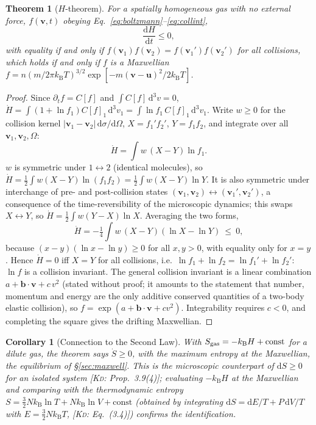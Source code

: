 \documentclass[11pt,a4paper]{report}
\theoremstyle{definition}
\theoremstyle{plain}
\newtheorem{theorem}[definition]{Theorem}
\newtheorem{corollary}[definition]{Corollary}
\newcommand{\KD}[1]{[\textsc{Kd}: #1]}   %
\newcommand{\kB}{k_{\mathrm{B}}}
\newcommand{\dd}{\mathrm{d}}
\newcommand{\vv}{\mathbf{v}}
\begin{document}
\begin{theorem}[$H$-theorem]\label{thm:Htheorem}
For a spatially homogeneous gas with no external force, $f(\vv,t)$ obeying Eq.~\eqref{eq:boltzmann}--\eqref{eq:collint},
\begin{equation}
\frac{\dd H}{\dd t}\le0,
\end{equation}
with equality if and only if $f(\vv_1)f(\vv_2)=f(\vv_1')f(\vv_2')$ for all collisions, which holds if and only if $f$ is a Maxwellian
$f=n(m/2\pi\kB T)^{3/2}\exp[-m(\vv-\mathbf u)^2/2\kB T]$.
\end{theorem}
\begin{proof}
Since $\partial_tf=C[f]$ and $\int C[f]\,\dd^3v=0$,
$\dot H=\int(1+\ln f_1)C[f]_1\,\dd^3v_1=\int\ln f_1\,C[f]_1\,\dd^3v_1$. Write $w\ge0$ for the collision kernel $|\vv_1-\vv_2|\,\dd\sigma/\dd\Omega$, $X=f_1'f_2'$, $Y=f_1f_2$, and integrate over all $\vv_1,\vv_2,\Omega$:
\[
\dot H=\int w\,(X-Y)\ln f_1 .
\]
$w$ is symmetric under $1\leftrightarrow2$ (identical molecules), so $\dot H=\tfrac12\int w(X-Y)\ln(f_1f_2)=\tfrac12\int w(X-Y)\ln Y$. It is also symmetric under interchange of pre- and post-collision states $(\vv_1,\vv_2)\leftrightarrow(\vv_1',\vv_2')$, a consequence of the time-reversibility of the microscopic dynamics; this swaps $X\leftrightarrow Y$, so $\dot H=\tfrac12\int w(Y-X)\ln X$. Averaging the two forms,
\[
\dot H=-\tfrac14\int w\,(X-Y)(\ln X-\ln Y)\ \le\ 0,
\]
because $(x-y)(\ln x-\ln y)\ge0$ for all $x,y>0$, with equality only for $x=y$. Hence $\dot H=0$ iff $X=Y$ for all collisions, i.e.\ $\ln f_1+\ln f_2=\ln f_1'+\ln f_2'$: $\ln f$ is a collision invariant. The general collision invariant is a linear combination $a+\mathbf b\cdot\vv+c\,v^2$ (stated without proof; it amounts to the statement that number, momentum and energy are the only additive conserved quantities of a two-body elastic collision), so $f=\exp(a+\mathbf b\cdot\vv+cv^2)$. Integrability requires $c<0$, and completing the square gives the drifting Maxwellian.
\end{proof}

\begin{corollary}[Connection to the Second Law]
With $S_{\rm gas}=-\kB H+\text{const}$ for a dilute gas, the theorem says $\dot S\ge0$, with the maximum entropy at the Maxwellian, the equilibrium of \S\ref{sec:maxwell}. This is the microscopic counterpart of $\dd S\ge0$ for an isolated system \KD{Prop.~3.9(4)}; evaluating $-\kB H$ at the Maxwellian and comparing with the thermodynamic entropy $S=\tfrac32N\kB\ln T+N\kB\ln V+\text{const}$ (obtained by integrating $\dd S=\dd E/T+P\,\dd V/T$ with $E=\tfrac32N\kB T$, \KD{Eq.~(3.4)}) confirms the identification.
\end{corollary}
\end{document}
